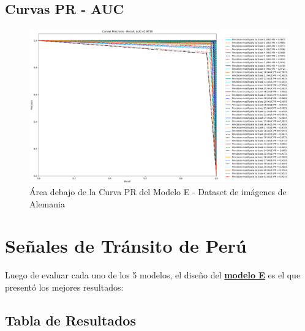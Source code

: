 		\subsection{Curvas PR - AUC}  
					\begin{figure}[H]
						\includegraphics[width=\textwidth,height=\textheight,keepaspectratio]{images/desarrollo/testResults/german/PR_curve_modelE} 
						\begin{center}
						\caption{\small{Área debajo de la Curva PR del Modelo E - Dataset de imágenes de Alemania}}
						{\small{\fontsize{10}{16.8}\selectfont {Fuente propia}}}
						\end{center}
						\vspace{-1.5em}
					\end{figure}		
	
	\section{Señales de Tránsito de Perú}

		Luego de evaluar cada uno de los 5 modelos, el diseño del \underline{\bf modelo E} es el que presentó los mejores resultados:

		\subsection{Tabla de Resultados}

